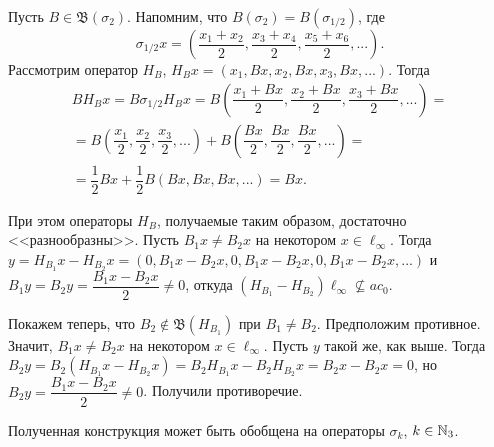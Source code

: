 \begin{example}
	Пусть $B\in\mathfrak B(\sigma_2)$.
	Напомним, что $B(\sigma_2) = B(\sigma_{1/2})$, где
	\begin{equation}
		\sigma_{1/2} x = \left(\dfrac{x_1+x_2}2, \dfrac{x_3+x_4}2, \dfrac{x_5+x_6}2, ...\right)
		.
	\end{equation}
	Рассмотрим оператор $H_B$, $H_Bx = (x_1, Bx, x_2, Bx, x_3, Bx, ...)$.
	Тогда
	\begin{multline}
		B H_B x = B \sigma_{1/2} H_B x = B\left(\dfrac{x_1+Bx}2, \dfrac{x_2+Bx}2, \dfrac{x_3+Bx}2, ...\right) =
		\\=
		B\left(\dfrac{x_1}2, \dfrac{x_2}2, \dfrac{x_3}2, ...\right) + B\left(\dfrac{Bx}2, \dfrac{Bx}2, \dfrac{Bx}2, ...\right)=
		\\=
		\dfrac12 Bx + \dfrac12 B\left(Bx, Bx, Bx, ...\right) = Bx
		.
	\end{multline}

	При этом операторы $H_B$, получаемые таким образом, достаточно <<разнообразны>>.
	Пусть $B_1 x \ne B_2 x$ на некотором $x\in \ell_\infty$.
	Тогда $y = H_{B_1} x - H_{B_2} x = (0, B_1 x - B_2 x, 0, B_1 x - B_2 x, 0, B_1 x - B_2 x, ...)$ и $B_1y = B_2y = \dfrac{B_1 x - B_2 x}2\ne 0$, откуда $(H_{B_1} - H_{B_2})\ell_\infty \not\subseteq ac_0$.


	Покажем  теперь, что $B_2 \notin \mathfrak B (H_{B_1})$ при $B_1 \ne B_2$. Предположим противное. Значит, $B_1 x \ne B_2 x$ на некотором $x\in \ell_\infty$. Пусть $y$ такой же, как выше. Тогда $B_2 y = B_2(H_{B_1} x - H_{B_2} x) = B_2 H_{B_1} x - B_2 H_{B_2} x = B_2 x - B_2 x = 0$, но $B_2 y = \dfrac{B_1x - B_2 x}{2} \ne 0$. Получили противоречие.
\end{example}

Полученная конструкция может быть обобщена на операторы $\sigma_k$, $k\in\mathbb{N}_3$.

